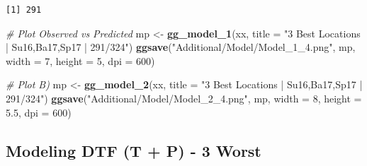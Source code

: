 \documentclass[
]{article}
\newenvironment{Shaded}{\begin{snugshade}}{\end{snugshade}}
\newcommand{\CommentTok}[1]{\textcolor[rgb]{0.56,0.35,0.01}{\textit{#1}}}
\newcommand{\DataTypeTok}[1]{\textcolor[rgb]{0.13,0.29,0.53}{#1}}
\newcommand{\DecValTok}[1]{\textcolor[rgb]{0.00,0.00,0.81}{#1}}
\newcommand{\FloatTok}[1]{\textcolor[rgb]{0.00,0.00,0.81}{#1}}
\newcommand{\KeywordTok}[1]{\textcolor[rgb]{0.13,0.29,0.53}{\textbf{#1}}}
\newcommand{\NormalTok}[1]{#1}
\newcommand{\OperatorTok}[1]{\textcolor[rgb]{0.81,0.36,0.00}{\textbf{#1}}}
\newcommand{\StringTok}[1]{\textcolor[rgb]{0.31,0.60,0.02}{#1}}
\begin{document}
\begin{Shaded}
\end{Shaded}

\begin{verbatim}
[1] 291
\end{verbatim}

\begin{Shaded}
\begin{Highlighting}[]
\CommentTok{# Plot Observed vs Predicted}
\NormalTok{mp <-}\StringTok{ }\KeywordTok{gg_model_1}\NormalTok{(xx, }\DataTypeTok{title =} \StringTok{"3 Best Locations | Su16,Ba17,Sp17 | 291/324"}\NormalTok{)}
\KeywordTok{ggsave}\NormalTok{(}\StringTok{"Additional/Model/Model_1_4.png"}\NormalTok{, mp, }\DataTypeTok{width =} \DecValTok{7}\NormalTok{, }\DataTypeTok{height =} \DecValTok{5}\NormalTok{, }\DataTypeTok{dpi =} \DecValTok{600}\NormalTok{)}
\end{Highlighting}
\end{Shaded}

\begin{Shaded}
\begin{Highlighting}[]
\CommentTok{# Plot B)}
\NormalTok{mp <-}\StringTok{ }\KeywordTok{gg_model_2}\NormalTok{(xx, }\DataTypeTok{title =} \StringTok{"3 Best Locations | Su16,Ba17,Sp17 | 291/324"}\NormalTok{)}
\KeywordTok{ggsave}\NormalTok{(}\StringTok{"Additional/Model/Model_2_4.png"}\NormalTok{, mp, }\DataTypeTok{width =} \DecValTok{8}\NormalTok{, }\DataTypeTok{height =} \FloatTok{5.5}\NormalTok{, }\DataTypeTok{dpi =} \DecValTok{600}\NormalTok{)}
\end{Highlighting}
\end{Shaded}

\hypertarget{modeling-dtf-t-p---3-worst}{%
\subsection{Modeling DTF (T + P) - 3
Worst}\label{modeling-dtf-t-p---3-worst}}
\end{document}
